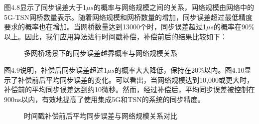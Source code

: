 \documentclass[UTF8,a4paper,12pt]{ctexart}
\numberwithin{equation}{section}
\begin{document}
图4.8显示了同步误差大于1$\mu s$的概率与网络规模之间的关系，网络规模由网络中的5G-TSN网桥数量表示。随着网络规模和网桥数量的增加，同步误差超过最低精度要求的概率也在增加。当网桥数量达到13000个时，同步误差超过1$\mu s$的概率在90\%以上。因此，我们应用算法进行时间戳补偿，补偿前后的结果比较如下：
\begin{figure}[htb] 
	\caption{多网桥场景下的同步误差越界概率与网络规模关系}
\end{figure}

图4.9说明，补偿后同步误差超过1$\mu s$的概率大大降低，保持在20\%以内。图4.10显示了补偿前后平均同步误差的变化。可以看出，当网络规模达到10,000或更大时，补偿前的平均同步误差达到约10微秒。然而，经过补偿后，平均同步误差被控制在900ns以内，有效地提高了使用集成5G和TSN的系统的同步精度。
\begin{figure}[H] 
	\caption{时间戳补偿前后平均同步误差与网络规模关系对比}
\end{figure}
\end{document}
